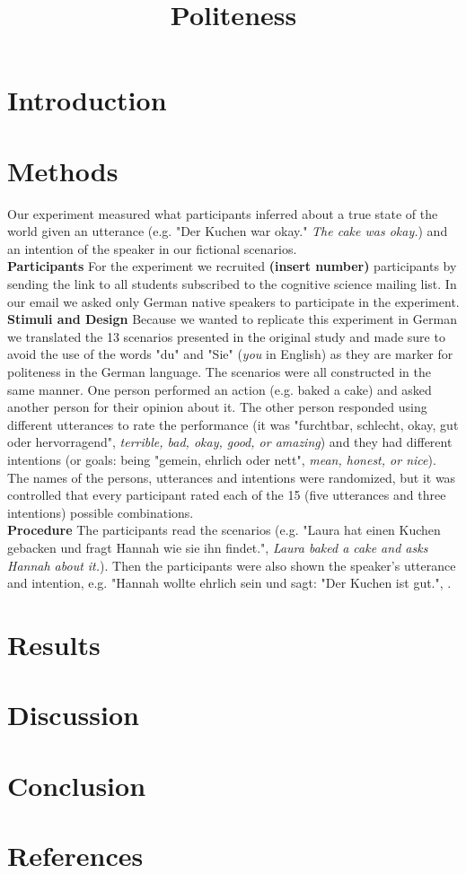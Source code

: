 \documentclass[a4paper,11pt]{article}
\title{Politeness}
\author{}
\begin{document}
\maketitle

\begin{abstract}

\end{abstract}

\section{Introduction}


\section{Methods}
Our experiment measured what participants inferred about a true state of the world given an utterance (e.g. "Der Kuchen war okay." \textit{The cake was okay.}) and an intention of the speaker in our fictional scenarios. \\
\textbf{Participants} For the experiment we recruited \textbf{(insert number)} participants by sending the link to all students subscribed to the cognitive science mailing list. In our email we asked only German native speakers to participate in the experiment.\\
\textbf{Stimuli and Design} Because we wanted to replicate this experiment in German we translated the 13 scenarios presented in the original study and made sure to avoid the use of the words "du" and "Sie" (\textit{you} in English) as they are marker for politeness in the German language. The scenarios were all constructed in the same manner. One person performed an action (e.g. baked a cake) and asked another person for their opinion about it. The other person responded using different utterances to rate the performance (it was "furchtbar, schlecht, okay, gut oder hervorragend", \textit{terrible, bad, okay, good, or amazing}) and they had different intentions (or goals: being "gemein, ehrlich oder nett", \textit{mean, honest, or nice}). The names of the persons, utterances and intentions were randomized, but it was controlled that every participant rated each of the 15 (five utterances and three intentions) possible combinations.\\
\textbf{Procedure} The participants read the scenarios (e.g. "Laura hat einen Kuchen gebacken und fragt Hannah wie sie ihn findet.", \textit{Laura baked a cake and asks Hannah about it.}). Then the participants were also shown the speaker's utterance and intention, e.g. "Hannah wollte ehrlich sein und sagt: "Der Kuchen ist gut.", .

\section{Results}

\section{Discussion}

\section{Conclusion}

\section{References}
\end{document}
